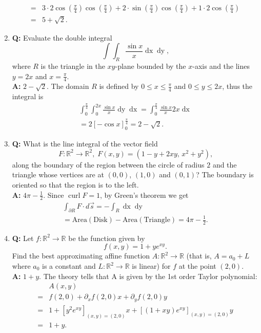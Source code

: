 \documentclass[a4paper,10pt]{article}
\def\R{\mathbb{R}}
\DeclareMathOperator{\curl}{curl}
\begin{document}
\begin{enumerate}
\begin{align*}
        =& 3 \cdot 2 \cos \left(\frac{\pi}{4}\right) \cos \left(\frac{\pi}{4}\right) + 2 \cdot \sin \left(\frac{\pi}{4}\right) \cos \left(\frac{\pi}{4}\right) + 1 \cdot 2 \cos \left(\frac{\pi}{4}\right)\\
        =& 5 + \sqrt{2} \text{.}
    \end{align*}
    \item \textbf{Q:} Evaluate the double integral
    \[\int \int_R \frac{\sin x}{x} \mathop{dx} \mathop{dy} \text{,}\]
    where $R$ is the triangle in the $xy$-plane bounded by the $x$-axis and the lines $y = 2x$ and $x = \frac{\pi}{4}$.\\
    \textbf{A:} $2 - \sqrt{2}$. The domain $R$ is defined by $0 \le x \le \frac{\pi}{4}$ and $0 \le y \le 2x$, thus the integral is
    \begin{multline*}
        \int_0^{\frac{\pi}{4}} \int_0^{2x} \frac{\sin x}{x} \mathop{dy} \mathop{dx} = \int_0^{\frac{\pi}{4}} \frac{\sin x}{x} 2x \mathop{dx}\\
        = 2 \left[- \cos x\right]_0^{\frac{\pi}{4}} = 2 - \sqrt{2} \text{.}
    \end{multline*}
    \item \textbf{Q:} What is the line integral of the vector field
    \[F: \R^2 \to \R^2,\; F(x, y) = (1 - y + 2xy,\, x^2 + y^2) \text{,}\]
    along the boundary of the region between the circle of radius $2$ and the triangle whose vertices are at $(0, 0)$, $(1, 0)$ and $(0, 1)$? The boundary is oriented so that the region is to the left.\\
    \textbf{A:} $4 \pi - \frac{1}{2}$. Since $\curl F = 1$, by Green's theorem we get
    \begin{multline*}
        \int_{\partial R} F \cdot d \Vec{s} = - \int_R \mathop{dx} \mathop{dy}\\
        = \text{Area}(\text{Disk}) - \text{Area}(\text{Triangle}) = 4 \pi - \frac{1}{2} \text{.}
    \end{multline*}
    \item \textbf{Q:} Let $f: \R^2 \to \R$ be the function given by
    \[f(x, y) = 1 + ye^{xy} \text{.}\]
    Find the best approximating affine function $A: \R^2 \to \R$ (that is, $A = a_0 + L$ where $a_0$ is a constant and $L: \R^2 \to \R$ is linear) for $f$ at the point $(2, 0)$.\\
    \textbf{A:} $1 + y$. The theory tells that A is given by the 1st order Taylor polynomial:
    \begin{align*}
        &A(x, y)\\
        =& f(2, 0) + \partial_x f(2, 0) x + \partial_y f(2, 0) y\\
      =& 1 + \left[y^2 e^{xy}\right]_{(x, y) = (2, 0)} x + \left[(1 + xy) e^{xy}\right]_{(x, y) = (2, 0)} y\\
      =& 1 + y \text{.}
    \end{align*}
\end{enumerate}
\end{document}

